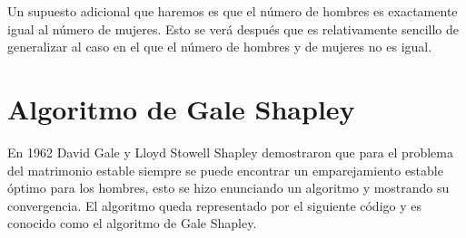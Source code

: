 Un supuesto adicional que haremos es que el número de hombres es exactamente igual al número de mujeres. Esto se verá después que es relativamente sencillo de generalizar al caso en el que el número de hombres y de mujeres no es igual. 

%


\section{Algoritmo de Gale Shapley}
En 1962 David Gale y Lloyd Stowell Shapley demostraron que para el problema del matrimonio estable siempre se puede encontrar un emparejamiento estable óptimo para los hombres, esto se hizo enunciando un algoritmo y mostrando su convergencia. El algoritmo queda representado por el siguiente código y es conocido como el algoritmo de Gale Shapley.


